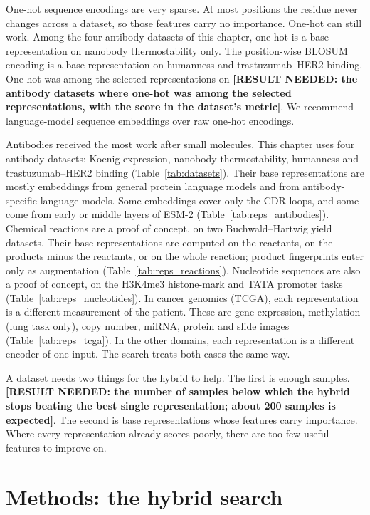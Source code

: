 One-hot sequence encodings are very sparse. At most positions the residue never changes across a dataset, so those features carry no importance. One-hot can still work. Among the four antibody datasets of this chapter, one-hot is a base representation on nanobody thermostability only. The position-wise BLOSUM encoding is a base representation on humanness and trastuzumab--HER2 binding. One-hot was among the selected representations on \textbf{[RESULT NEEDED: the antibody datasets where one-hot was among the selected representations, with the score in the dataset's metric]}. We recommend language-model sequence embeddings over raw one-hot encodings.

Antibodies received the most work after small molecules. This chapter uses four antibody datasets: Koenig expression, nanobody thermostability, humanness and trastuzumab--HER2 binding (Table~\ref{tab:datasets}). Their base representations are mostly embeddings from general protein language models and from antibody-specific language models. Some embeddings cover only the CDR loops, and some come from early or middle layers of ESM-2 (Table~\ref{tab:reps_antibodies}). Chemical reactions are a proof of concept, on two Buchwald--Hartwig yield datasets. Their base representations are computed on the reactants, on the products minus the reactants, or on the whole reaction; product fingerprints enter only as augmentation (Table~\ref{tab:reps_reactions}). Nucleotide sequences are also a proof of concept, on the H3K4me3 histone-mark and TATA promoter tasks (Table~\ref{tab:reps_nucleotides}). In cancer genomics (TCGA), each representation is a different measurement of the patient. These are gene expression, methylation (lung task only), copy number, miRNA, protein and slide images (Table~\ref{tab:reps_tcga}). In the other domains, each representation is a different encoder of one input. The search treats both cases the same way.

A dataset needs two things for the hybrid to help. The first is enough samples. \textbf{[RESULT NEEDED: the number of samples below which the hybrid stops beating the best single representation; about 200 samples is expected]}. The second is base representations whose features carry importance. Where every representation already scores poorly, there are too few useful features to improve on.


\section{Methods: the hybrid search}

